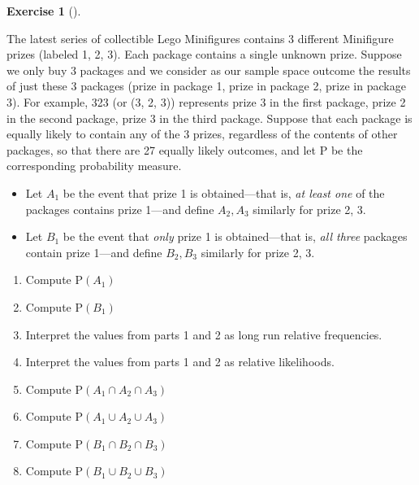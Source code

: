 \documentclass[
  letterpaper,
  DIV=11,
  numbers=noendperiod]{scrreprt}
\providecommand{\tightlist}{%
  \setlength{\itemsep}{0pt}\setlength{\parskip}{0pt}}
\theoremstyle{plain}
\theoremstyle{definition}
\theoremstyle{definition}
\newtheorem{exercise}{Exercise}[chapter]
\theoremstyle{definition}
\theoremstyle{remark}
\begin{document}
\begin{exercise}[]\protect\hypertarget{exr-probspace-collector3-a}{}\label{exr-probspace-collector3-a}

The latest series of collectible Lego Minifigures contains 3 different
Minifigure prizes (labeled 1, 2, 3). Each package contains a single
unknown prize. Suppose we only buy 3 packages and we consider as our
sample space outcome the results of just these 3 packages (prize in
package 1, prize in package 2, prize in package 3). For example, 323 (or
(3, 2, 3)) represents prize 3 in the first package, prize 2 in the
second package, prize 3 in the third package. Suppose that each package
is equally likely to contain any of the 3 prizes, regardless of the
contents of other packages, so that there are 27 equally likely
outcomes, and let \(\textrm{P}\) be the corresponding probability
measure.

\begin{itemize}
\tightlist
\item
  Let \(A_1\) be the event that prize 1 is obtained---that is, \emph{at
  least one} of the packages contains prize 1---and define \(A_2, A_3\)
  similarly for prize 2, 3.
\item
  Let \(B_1\) be the event that \emph{only} prize 1 is obtained---that
  is, \emph{all three} packages contain prize 1---and define
  \(B_2, B_3\) similarly for prize 2, 3.
\end{itemize}

\begin{enumerate}
\def\labelenumi{\arabic{enumi}.}
\tightlist
\item
  Compute \(\textrm{P}(A_1)\)
\item
  Compute \(\textrm{P}(B_1)\)
\item
  Interpret the values from parts 1 and 2 as long run relative
  frequencies.
\item
  Interpret the values from parts 1 and 2 as relative likelihoods.
\item
  Compute \(\textrm{P}(A_1 \cap A_2 \cap A_3)\)
\item
  Compute \(\textrm{P}(A_1 \cup A_2 \cup A_3)\)
\item
  Compute \(\textrm{P}(B_1 \cap B_2 \cap B_3)\)
\item
  Compute \(\textrm{P}(B_1 \cup B_2 \cup B_3)\)
\end{enumerate}

\end{exercise}
\end{document}
